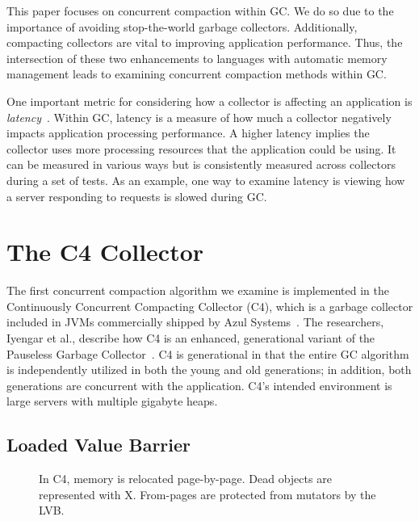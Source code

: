 \documentclass{sig-alternate}
\begin{document}
This paper focuses on
concurrent compaction within GC. We do so due to the importance 
of avoiding stop-the-world garbage collectors. Additionally, compacting
collectors are vital to improving application performance. Thus,
the intersection of these two enhancements to languages with automatic memory management leads
to examining concurrent compaction methods within GC.

One important metric for considering
how a collector is affecting an application is \emph{latency}~\cite{Lindblom:2011}.
Within GC, latency is a measure of how much a collector negatively impacts
application processing performance. A higher latency implies the collector
uses more processing resources that the application could be using. It 
can be measured in various ways but is consistently measured across 
collectors during a set of tests. As an example, one way to
examine latency is viewing how a server responding to requests is slowed
during GC.


\section{The C4 Collector}
\label{sec:c4}

The first concurrent compaction algorithm we examine is implemented in the 
Continuously Concurrent Compacting Collector (C4), which is a garbage collector 
included in JVMs commercially shipped by Azul Systems~\cite{Tene:C4}. The 
researchers, Iyengar et al., describe how C4 is an enhanced, generational variant
of the Pauseless Garbage Collector~\cite{Click:Pauseless}. C4 is generational in 
that the entire GC algorithm is independently utilized in both the young and old generations;
in addition, both generations are concurrent with the application. 
C4's intended environment is large servers with multiple gigabyte heaps.


\subsection{Loaded Value Barrier}
\label{sec:c4LVB}

\begin{figure}
\centering
{}
\caption{In C4, memory is relocated
page-by-page. Dead objects are represented with X.
From-pages are protected from mutators by the LVB.}
\label{fig:c4Memory}
\end{figure}

\end{document}
